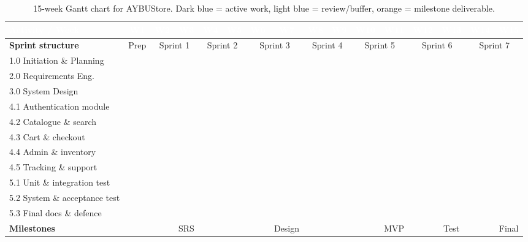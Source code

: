 \documentclass[11pt,a4paper]{article}
\providecommand{\GA}{\cellcolor{ganttActive}}
\providecommand{\GB}{\cellcolor{ganttBuffer}}
\begin{document}
\renewcommand{\arraystretch}{1.15}
\begin{table}[H]
\centering
\scriptsize
\setlength{\tabcolsep}{2pt}
\begin{tabular}{|p{2.8cm}|*{15}{c|}}
\hline
\rowcolor{aybuHeader}
\textcolor{white}{\textbf{Activity / Week}} &
\textcolor{white}{\textbf{W1}} & \textcolor{white}{\textbf{W2}} &
\textcolor{white}{\textbf{W3}} & \textcolor{white}{\textbf{W4}} &
\textcolor{white}{\textbf{W5}} & \textcolor{white}{\textbf{W6}} &
\textcolor{white}{\textbf{W7}} & \textcolor{white}{\textbf{W8}} &
\textcolor{white}{\textbf{W9}} & \textcolor{white}{\textbf{W10}} &
\textcolor{white}{\textbf{W11}} & \textcolor{white}{\textbf{W12}} &
\textcolor{white}{\textbf{W13}} & \textcolor{white}{\textbf{W14}} &
\textcolor{white}{\textbf{W15}} \\ \hline
 
\rowcolor{ganttSprint}
\textbf{Sprint structure} & Prep & \multicolumn{2}{c|}{Sprint 1} &
\multicolumn{2}{c|}{Sprint 2} & \multicolumn{2}{c|}{Sprint 3} &
\multicolumn{2}{c|}{Sprint 4} & \multicolumn{2}{c|}{Sprint 5} &
\multicolumn{2}{c|}{Sprint 6} & \multicolumn{2}{c|}{Sprint 7} \\ \hline
 
1.0 Initiation \& Planning & \GA & \GA & & & & & & & & & & & & & \\ \hline
2.0 Requirements Eng. & \GA & \GA & \GA & \GB & \GB & & & & & & & & & & \\ \hline
3.0 System Design & & \GA & \GA & \GA & \GA & \GB & \GB & & & & & & & & \\ \hline
4.1 Authentication module & & \GA & \GA & \GA & \GA & & & & & & & & & & \\ \hline
4.2 Catalogue \& search & & & & \GA & \GA & \GA & \GA & & & & & & & & \\ \hline
4.3 Cart \& checkout & & & & & & \GA & \GA & \GA & \GA & & & & & & \\ \hline
4.4 Admin \& inventory & & & & & & & & \GA & \GA & \GA & \GA & & & & \\ \hline
4.5 Tracking \& support & & & & & & & & & & \GA & \GA & \GA & \GA & & \\ \hline
5.1 Unit \& integration test & & & & \GB & \GB & \GB & \GB & \GB & \GB & \GB & \GA & \GA & \GA & & \\ \hline
5.2 System \& acceptance test & & & & & & & & & & & & & \GA & \GA & \\ \hline
5.3 Final docs \& defence & & & & & & & & & & & & & & \GA & \GA \\ \hline
 
\rowcolor{ganttMile}
\textbf{Milestones} & & & SRS & & & & Design & & & & MVP & & Test & & Final \\ \hline
\end{tabular}
\caption{15-week Gantt chart for AYBUStore. Dark blue = active work,
light blue = review/buffer, orange = milestone deliverable.}
\label{tab:gantt}
\end{table}
 
\end{document}

